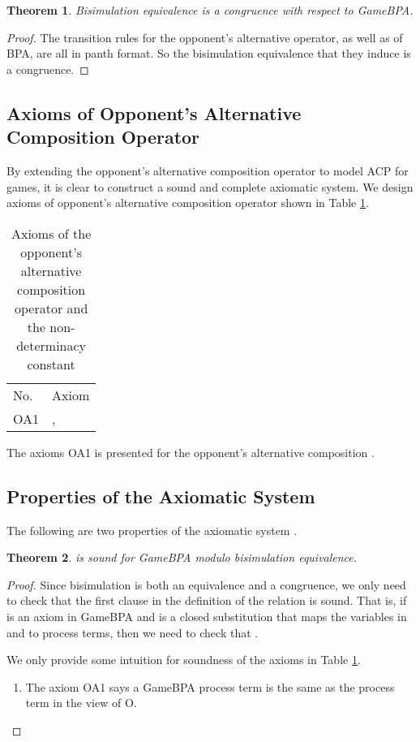 \documentclass{fac}
\newtheorem{theorem}{Theorem}[section]
\begin{document}
\begin{theorem}
Bisimulation equivalence is a congruence with respect to GameBPA.
\end{theorem}

\begin{proof}
The transition rules for the opponent's alternative operator, as well as of BPA, are all in panth format. So the bisimulation equivalence that they induce is a congruence.
\end{proof}

\subsection{Axioms of Opponent's Alternative Composition Operator}

By extending the opponent's alternative composition operator  to model ACP for games, it is clear to construct a sound and complete axiomatic system. We design axioms of opponent's alternative composition operator  shown in Table \ref{AxiomOfOAC}.

\begin{center}
\begin{table}
  \begin{tabular}{@{}ll@{}}
\hline No. &Axiom\\
  OA1 & ,  \\
\end{tabular}
\caption{Axioms of the opponent's alternative composition operator and the non-determinacy constant}
\label{AxiomOfOAC}
\end{table}
\end{center}

The axioms OA1 is presented for the opponent's alternative composition .

\subsection{Properties of the Axiomatic System}

The following are two properties of the axiomatic system .

\begin{theorem}
  is sound for GameBPA modulo bisimulation equivalence.
\end{theorem}

\begin{proof}
Since bisimulation is both an equivalence and a congruence, we only need to check that the first clause in the definition of the relation  is sound.
That is, if  is an axiom in GameBPA and  is a closed substitution that maps the variables in  and  to process terms, then we need to check that .

We only provide some intuition for soundness of the axioms in Table \ref{AxiomOfOAC}.

\begin{enumerate}
  \item The axiom OA1 says a GameBPA process term  is the same as the process term  in the view of O.
\end{enumerate}
\end{proof}
\end{document}
